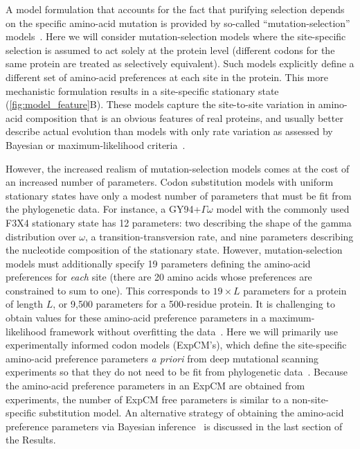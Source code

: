 \documentclass[11pt]{article}
\begin{document}
A model formulation that accounts for the fact that purifying selection depends on the specific amino-acid mutation is provided by so-called ``mutation-selection'' models~\citep{halpern1998evolutionary,yang2008mutation,rodrigue2010mutation,tamuri2012estimating,mccandlish2014modeling}.
Here we will consider mutation-selection models where the site-specific selection is assumed to act solely at the protein level (different codons for the same protein are treated as selectively equivalent).
Such models explicitly define a different set of amino-acid preferences at each site in the protein. 
This more mechanistic formulation results in a site-specific stationary state (\ref{fig:model_feature}B). 
These models capture the site-to-site variation in amino-acid composition that is an obvious features of real proteins, and usually better describe actual evolution than models with only rate variation as assessed by Bayesian or maximum-likelihood criteria~\citep{lartillot2004bayesian, le2008phylogenetic, si2008empirical, wang2008class, rodrigue2010mutation,bloom2014experimentally,bloom2014informed,hilton2017phydms}.

However, the increased realism of mutation-selection models comes at the cost of an increased number of parameters. 
Codon substitution models with uniform stationary states have only a modest number of parameters that must be fit from the phylogenetic data.
For instance, a GY94+$\Gamma\omega$ model with the commonly used F3X4 stationary state has 12 parameters: two describing the shape of the gamma distribution over $\omega$, a transition-transversion rate, and nine parameters describing the nucleotide composition of the stationary state.
However, mutation-selection models must additionally specify 19 parameters defining the amino-acid preferences for \emph{each} site (there are 20 amino acids whose preferences are constrained to sum to one).
This corresponds to $19\times L$ parameters for a protein of length $L$, or 9,500 parameters for a 500-residue protein.
It is challenging to obtain values for these amino-acid preference parameters in a maximum-likelihood framework without overfitting the data~\citep{rodrigue2013statistical}.
Here we will primarily use experimentally informed codon models (ExpCM's), which define the site-specific amino-acid preference parameters \textit{a priori} from deep mutational scanning experiments so that they do not need to be fit from phylogenetic data~\citep[see Methods and][]{bloom2014experimentally, hilton2017phydms, bloom2017identification}.
Because the amino-acid preference parameters in an ExpCM are obtained from experiments, the number of ExpCM free parameters is similar to a non-site-specific substitution model.
An alternative strategy of obtaining the amino-acid preference parameters via Bayesian inference~\citep{lartillot2004bayesian, rodrigue2014site} is discussed in the last section of the Results.
\end{document}
